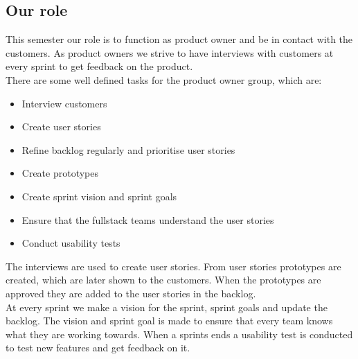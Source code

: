 \subsection{Our role}
This semester our role is to function as product owner and be in contact with the customers.
As product owners we strive to have interviews with customers at every sprint to get feedback on the product.
\\
There are some well defined tasks for the product owner group, which are:
\begin{itemize}
    \item Interview customers
    \item Create user stories    
    \item Refine backlog regularly and prioritise user stories
    \item Create prototypes
    \item Create sprint vision and sprint goals
    \item Ensure that the fullstack teams understand the user stories
    \item Conduct usability tests
\end{itemize}
\noindent
The interviews are used to create user stories. 
From user stories prototypes are created, which are later shown to the customers.
When the prototypes are approved they are added to the user stories in the backlog.
\\
At every sprint we make a vision for the sprint, sprint goals and update the backlog. 
The vision and sprint goal is made to ensure that every team knows what they are working towards.
When a sprints ends a usability test is conducted to test new features and get feedback on it.
